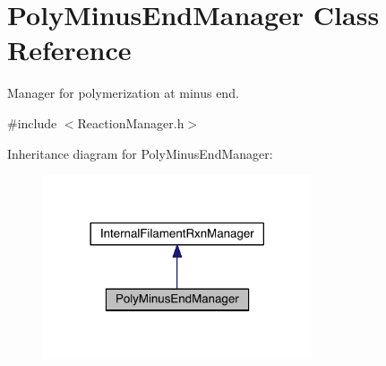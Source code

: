 \hypertarget{classPolyMinusEndManager}{\section{Poly\+Minus\+End\+Manager Class Reference}
\label{classPolyMinusEndManager}
}


Manager for polymerization at minus end.  




{\ttfamily \#include $<$Reaction\+Manager.\+h$>$}



Inheritance diagram for Poly\+Minus\+End\+Manager\+:\nopagebreak
\begin{figure}[H]
\begin{center}
\leavevmode
\includegraphics[width=225pt]{classPolyMinusEndManager__inherit__graph}
\end{center}
\end{figure}


